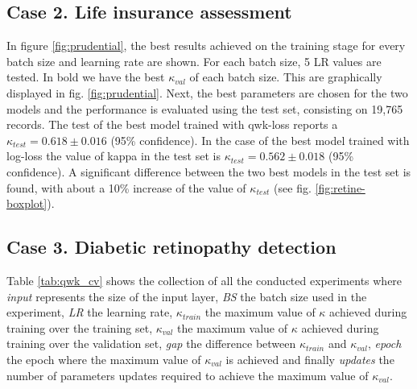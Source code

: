 \documentclass[times,twocolumn,final,authoryear]{elsarticle}
\begin{document}
\subsection{Case 2. Life insurance assessment}

In figure \ref{fig:prudential}, the best results achieved on the training stage for every batch size and learning rate are shown. For each batch size, 5 LR values are tested. In bold we have the best $\kappa_{val}$ of each batch size. This are graphically displayed in fig. \ref{fig:prudential}.
Next, the best parameters are chosen for the two models and the performance is evaluated using the test set, consisting on 19,765 records. The test of the best model trained with qwk-loss reports a $\kappa_{test} = 0.618 \pm 0.016$ (95\% confidence). In the case of the best model trained with log-loss the value of kappa in the test set is $\kappa_{test} = 0.562 \pm 0.018$ (95\% confidence). A significant difference between the two best models in the test set is found, with about a 10\% increase of the value of $\kappa_{test}$ (see fig. \ref{fig:retine-boxplot}).


\subsection{Case 3. Diabetic retinopathy detection}

Table \ref{tab:qwk_cv} shows the collection of all the conducted experiments where \emph{input} represents the size of the input layer, \emph{BS} the batch size used in the experiment, \emph{LR} the learning rate, \emph{$\kappa_{train}$} the maximum value of $\kappa$ achieved during training over the training set, \emph{$\kappa_{val}$} the maximum value of $\kappa$ achieved during training over the validation set, \emph{gap} the difference between $\kappa_{train}$ and $\kappa_{val}$, \emph{epoch} the epoch where the maximum value of $\kappa_{val}$ is achieved and finally \emph{updates} the number of parameters updates required to achieve the maximum value of $\kappa_{val}$.
\end{document}
